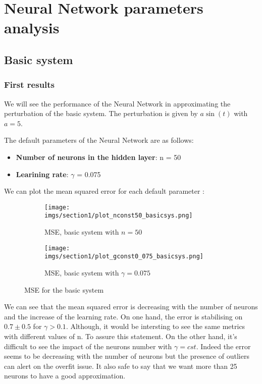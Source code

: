 \chapter{Neural Network parameters analysis}
\section{Basic system}
\subsection{First results}

We will see the performance of the Neural Network in approximating the perturbation %
of the basic system. The perturbation is given by \( a \sin(t) \) with \( a = 5 \). %

The default parameters of the Neural Network are as follows:
\begin{itemize}
    \item \textbf{Number of neurons in the hidden layer}: n = 50
    \item \textbf{Learining rate}: \(\gamma\) = 0.075
\end{itemize}

We can plot the mean squared error for each default parameter : 

\begin{figure}[htbp]
    \centering
    \begin{subfigure}{0.49\textwidth}
        \centering
        \texttt{[image: imgs/section1/plot\_nconst50\_basicsys.png]}
        \caption{MSE, basic system with \(n = 50\)}
        \label{fig:plot_nconst50_basicsys}
    \end{subfigure}
    \hfill
    \begin{subfigure}{0.49\textwidth}
        \centering
        \texttt{[image: imgs/section1/plot\_gconst0\_075\_basicsys.png]}
        \caption{MSE, basic system with \(\gamma = 0.075\)}
        \label{fig:plot_gammconst075_basicsys}
    \end{subfigure}
    \caption{MSE for the basic system}
    \label{fig:double_plot_basicsys}
\end{figure}

We can see that the mean squared error is decreasing with the number of neurons and the increase %
of the learning rate. On one hand, the error is stabilising on \(0.7 \pm 0.5\) for \(\gamma > 0.1\). %
Although, it would be intersting to see the same metrics with different values of n. To %
assure this statement. On the other hand, it's difficult to see the impact of the %
neurons number with \(\gamma = cst\). Indeed the error seems to be decreasing with %
the number of neurons but the presence of outliers can alert on the overfit issue. %
It also safe to say that we want more than 25 neurons to have a good approximation. %


